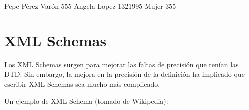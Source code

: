 \documentclass[letterpaper,10pt,spanish]{sphinxmanual}
\begin{document}
\begin{sphinxVerbatim}[commandchars=\\\{\}]
                 Pepe Pérez 
                 Varón 
                555
                 Angela Lopez 
                13\PYGZhy{}2\PYGZhy{}1995
                 Mujer 
                355
\end{sphinxVerbatim}


\section{XML Schemas}
\label{\detokenize{tema1:xml-schemas}}
Los XML Schemas surgen para mejorar las faltas de precisión que tenían las DTD. Sin embargo,
la mejora en la precisión de la definición ha implicado que escribir XML Schemas sea
mucho más complicado.

Un ejemplo de XML Schema (tomado de Wikipedia):
\end{document}
